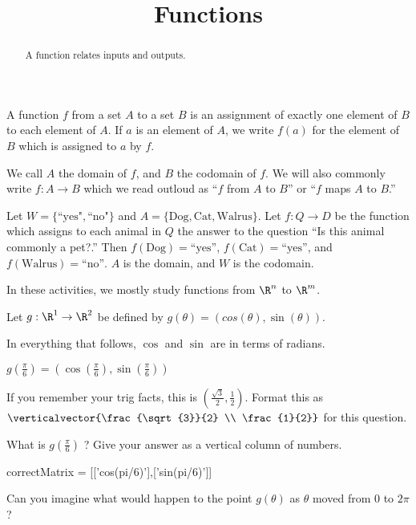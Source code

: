 \documentclass{ximera}
\title{Functions}
\begin{document}
\begin{abstract}
  A function relates inputs and outputs.
\end{abstract}

\begin{definition}
  A function $f$ from a set $A$ to a set $B$ is an assignment of
  exactly one element of $B$ to each element of $A$.  If $a$ is an
  element of $A$, we write $f(a)$ for the element of $B$ which is
  assigned to $a$ by $f$.
\end{definition}

We call $A$ the domain of $f$, and $B$ the codomain of $f$.  We will
also commonly write $f:A \to B$ which we read outloud as ``$f$ from
$A$ to $B$'' or ``$f$ maps $A$ to $B$.''

\begin{example}
  Let $W =\{ \text{``yes"},\text{``no"}\}$ and $A = \{ \text{Dog},
  \text{Cat}, \text{Walrus}\}$.  Let $f:Q \to D$ be the function which
  assigns to each animal in $Q$ the answer to the question ``Is this
  animal commonly a pet?.''  Then $f(\text{Dog}) = \text{``yes''}$,
  $f(\text{Cat}) = \text{``yes''}$, and $f(\text{Walrus}) =
  \text{``no''}$.  $A$ is the domain, and $W$ is the codomain.
\end{example}

In these activities, we mostly study functions from $\R^n$ to $\R^m$.

\begin{question}
  Let $g:\R^1 \to \R^2$ be defined by $g(\theta) = (cos(\theta),\sin(\theta))$.
  \begin{solution}
    \begin{hint}
      \begin{warning}
        In everything that follows, $\cos$ and $\sin$ are in terms of radians.
      \end{warning}
    \end{hint}
    \begin{hint}
      $g(\frac{\pi}{6}) = (\cos(\frac{\pi}{6}),\sin(\frac{\pi}{6}))$
    \end{hint}
    \begin{hint}
      If you remember your trig facts, this is
      $(\frac{\sqrt{3}}{2},\frac{1}{2})$.  Format this as
      $\verticalvector{\frac{\sqrt{3}}{2} \\ \frac{1}{2}}$ for
      this question.
    \end{hint}
    What is $g(\frac{\pi}{6})$ ?  Give your answer as a vertical column of numbers.
    \begin{matrix-answer}
      correctMatrix = [['cos(pi/6)'],['sin(pi/6)']]
    \end{matrix-answer}
  \end{solution}
  
  Can you imagine what would happen to the point $g(\theta)$ as $\theta$ moved from $0$ to $2\pi$?
\end{question}
\end{document}
